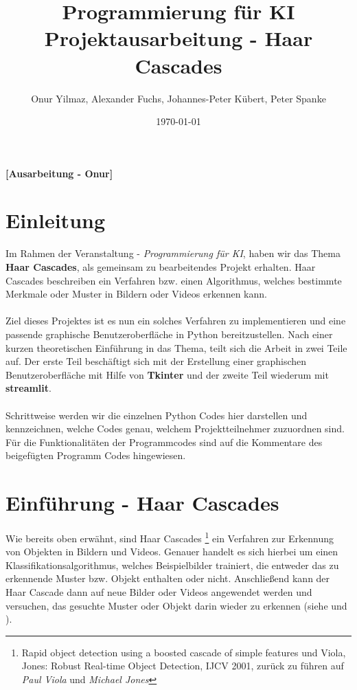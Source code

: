 \documentclass{article}
\begin{document}
\title{Programmierung für KI \\ Projektausarbeitung - Haar Cascades}
\author{Onur Yilmaz, Alexander Fuchs, Johannes-Peter Kübert, Peter Spanke}
\date{\today}
\maketitle
\newpage
	\tableofcontents
	\vspace{2cm} %

\newpage
\textbf{[Ausarbeitung - Onur]}
\section*{Einleitung}
Im Rahmen der Veranstaltung - \textit{Programmierung für KI}, haben wir das Thema \textbf{Haar Cascades}, als gemeinsam zu bearbeitendes Projekt erhalten. Haar Cascades beschreiben ein Verfahren bzw. einen Algorithmus, welches bestimmte Merkmale oder Muster in Bildern oder Videos erkennen kann.
\\ \\
Ziel dieses Projektes ist es nun ein solches Verfahren zu implementieren und eine passende graphische Benutzeroberfläche in Python bereitzustellen. Nach einer kurzen theoretischen Einführung in das Thema, teilt sich die Arbeit in zwei Teile auf. 
Der erste Teil beschäftigt sich mit der Erstellung einer graphischen Benutzeroberfläche mit Hilfe von \textbf{Tkinter} und der zweite Teil wiederum mit \textbf{streamlit}.
\\ \\
Schrittweise werden wir die einzelnen Python Codes hier darstellen und kennzeichnen, welche Codes genau, welchem Projektteilnehmer zuzuordnen sind. Für die Funktionalitäten der Programmcodes sind auf die Kommentare des beigefügten Programm Codes hingewiesen.

\section{Einführung - Haar Cascades}

Wie bereits oben erwähnt, sind Haar Cascades \footnote{ Rapid object detection using a boosted cascade of simple features und Viola, Jones: Robust Real-time Object Detection, IJCV 2001, zurück zu führen auf \textit{Paul Viola} und \textit{Michael Jones}} ein Verfahren zur Erkennung von Objekten in Bildern und Videos. Genauer handelt es sich hierbei um einen Klassifikationsalgorithmus, welches Beispielbilder trainiert, die entweder das zu erkennende Muster bzw. Objekt enthalten oder nicht. Anschließend kann der Haar Cascade dann auf neue Bilder oder Videos angewendet werden und versuchen, das gesuchte Muster oder Objekt darin wieder zu erkennen (siehe \cite{first} und \cite{second}).
\end{document}
